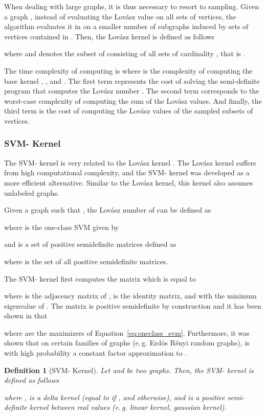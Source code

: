 \documentclass[twoside,11pt]{article}
\newcommand{\eg}{e.\,g. }
\newtheorem{definition}{Definition}
\begin{document}
When dealing with large graphs, it is thus necessary to resort to sampling.
Given a graph , instead of evaluating the Lov\'asz value on all  sets of vertices, the algorithm evaluates it in on a smaller number of subgraphs induced by sets of vertices contained in .
Then, the Lov\'asz  kernel is defined as follows

where  and  denotes the subset of  consisting of all sets of cardinality , that is .

The time complexity of computing  is  where  is the complexity of computing the base kernel , ,  and .
The first term represents the cost of solving the semi-definite program that computes the Lov\'asz number .
The second term corresponds to the worst-case complexity of computing the sum of the Lov\'asz values.
And finally, the third term is the cost of computing the Lov\'asz values of the sampled subsets of vertices.


\subsubsection{SVM- Kernel}
The SVM- kernel is very related to the Lov\'asz  kernel \cite{johansson2014global}.
The Lov\'asz  kernel suffers from high computational complexity, and the SVM- kernel was developed as a more efficient alternative. 
Similar to the Lov\'asz  kernel, this kernel also assumes unlabeled graphs.

Given a graph  such that , the Lov\'asz number of  can be defined as

where  is the one-class SVM given by

and  is a set of positive semidefinite matrices defined as

where  is the set of all  positive semidefinite matrices.

The SVM- kernel first computes the matrix  which is equal to

where  is the adjacency matrix of ,  is the  identity matrix, and  with  the minimum eigenvalue of .
The matrix  is positive semidefinite by construction and it has been shown in \cite{jethava2013lovasz} that

where  are the maximizers of Equation~\ref{eq:oneclass_svm}. 
Furthermore, it was shown that on certain families of graphs (\eg Erd{\"o}s R{\'e}nyi random graphs),  is with high probability a constant factor approximation to .

\begin{definition}[SVM- Kernel]
	Let  and  be two graphs.
	Then, the SVM- kernel is defined as follows
	
	where ,  is a delta kernel (equal to  if , and  otherwise), and  is a positive semi-definite kernel between real values (\eg linear kernel, gaussian kernel).
\end{definition}
\end{document}
